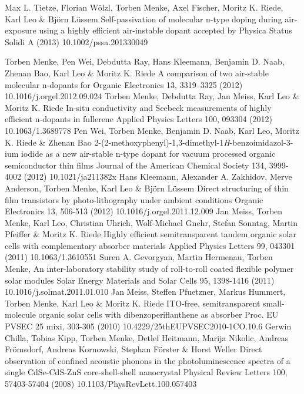 \begin{enumerate}
%
\myPaper
{Max L. Tietze, Florian Wölzl, Torben Menke, Axel Fischer, Moritz K. Riede, Karl Leo \& Björn Lüssem}
{Self-passivation of molecular n-type doping during air-exposure using a highly efficient air-instable dopant}
{accepted by Physica Status Solidi A (2013)}
{10.1002/pssa.201330049}

\myPaper
{Torben Menke, Pen Wei, Debdutta Ray, Hans Kleemann, Benjamin D. Naab, Zhenan Bao, Karl Leo \& Moritz K. Riede}
{A comparison of two air-stable molecular n-dopants for \CS{}}
{Organic Electronics 13, 3319–3325 (2012)}
{10.1016/j.orgel.2012.09.024}
%
\myPaper
{Torben Menke, Debdutta Ray, Jan Meiss, Karl Leo \& Moritz K. Riede}
{In-situ conductivity and Seebeck measurements of highly efficient n-dopants in fullerene \CS{}}
{Applied Physics Letters 100, 093304 (2012)}
{10.1063/1.3689778}
%
\myPaper
{Pen Wei, Torben Menke, Benjamin D. Naab, Karl Leo, Moritz K. Riede \& Zhenan Bao}
{2-(2-methoxyphenyl)-1,3-dimethyl-1\textsl{H}-benzoimidazol-3-ium iodide as a new air-stable n-type dopant for vacuum processed organic semiconductor thin films}
{Journal of the American Chemical Society 134, 3999-4002 (2012)}
{10.1021/ja211382x}
%
\myPaper
{Hans Kleemann, Alexander A. Zakhidov, Merve Anderson, Torben Menke, Karl Leo \& Björn Lüssem}
{Direct structuring of \CS thin film transistors by photo-lithography under ambient conditions}
{Organic Electronics 13, 506-513 (2012)}
{10.1016/j.orgel.2011.12.009}
%
\myPaper
{Jan Meiss, Torben Menke, Karl Leo, Christian Uhrich, Wolf-Michael Gnehr, Stefan Sonntag, Martin Pfeiffer \& Moritz K. Riede}
{Highly efficient semitransparent tandem organic solar cells with complementary absorber materials}
{Applied Physics Letters 99, 043301 (2011)}
{10.1063/1.3610551}
%
\myPaper
{Suren A. Gevorgyan, Martin Hermenau, Torben Menke,\normalfont{\etal{}}}
{An inter-laboratory stability study of roll-to-roll coated flexible polymer solar modules}
{Solar Energy Materials and Solar Cells 95, 1398-1416 (2011)}
{10.1016/j.solmat.2011.01.010}
%
\myPaper
{Jan Meiss, Steffen Pfuetzner, Markus Hummert, Torben Menke, Karl Leo \& Moritz K. Riede}
{ITO-free, semitransparent small-molecule organic solar cells with dibenzoperiflanthene as absorber}
{Proc. EU PVSEC 25 mixi, 303-305 (2010)}
{10.4229/25thEUPVSEC2010-1CO.10.6}
%
\myPaper
{Gerwin Chilla, Tobias Kipp, Torben Menke, Detlef Heitmann, Marija Nikolic, Andreas Frömsdorf, Andreas Kornowski, Stephan Förster \& Horst Weller}
{Direct observation of confined acoustic phonons in the photoluminescence spectra of a single CdSe-CdS-ZnS core-shell-shell nanocrystal}
{Physical Review Letters 100, 57403-57404 (2008)}
{10.1103/PhysRevLett.100.057403}
\end{enumerate}

